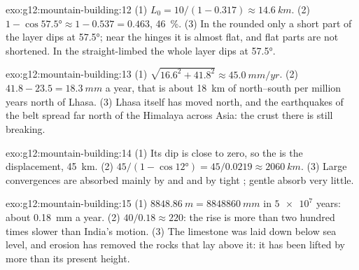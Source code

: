 \begin{solution}{exo:g12:mountain-building:12}
(1) $L_0 = 10/(1 - 0.317) \approx \qty{14.6}{km}$. (2) $1 - \cos\ang{57.5}
\approx 1 - 0.537 = 0.463$, \qty{46}{\percent}. (3) In the rounded 
only a short part of the layer dips at \ang{57.5}; near the hinges it is
almost flat, and flat parts are not shortened. In the straight-limbed 
the whole layer dips at \ang{57.5}.
\end{solution}

\begin{solution}{exo:g12:mountain-building:13}
(1) $\sqrt{16.6^2 + 41.8^2} \approx \qty{45.0}{mm/yr}$. (2) $41.8 - 23.5 =
\qty{18.3}{mm}$ a year, that is about \qty{18}{km} of north--south 
per million years north of Lhasa. (3) Lhasa itself has moved north, and the
earthquakes of the belt spread far north of the Himalaya across Asia: the
crust there is still breaking.
\end{solution}

\begin{solution}{exo:g12:mountain-building:14}
(1) Its dip is close to zero, so the  is the displacement,
\qty{45}{km}. (2) $45/(1 - \cos\ang{12}) = 45/0.0219 \approx \qty{2060}{km}$.
(3) Large convergences are absorbed mainly by  and  and by tight
; gentle  absorb very little.
\end{solution}

\begin{solution}{exo:g12:mountain-building:15}
(1) $\qty{8848.86}{m} = \qty{8848860}{mm}$ in $\num{5e7}$ years: about
\qty{0.18}{mm} a year. (2) $40/0.18 \approx 220$: the rise is more than two
hundred times slower than India's motion. (3) The limestone was laid down
below sea level, and erosion has removed the rocks that lay above it: it has
been lifted by more than its present height.
\end{solution}

